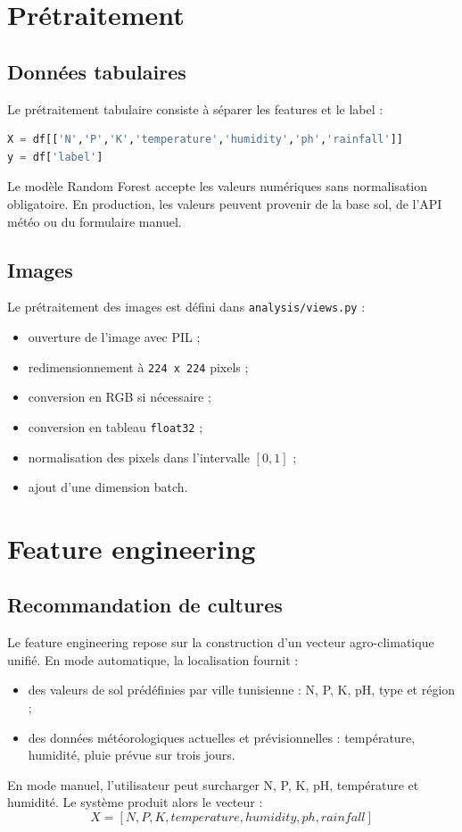 \documentclass[12pt,a4paper]{report}
\begin{document}
\section{Prétraitement}
\subsection{Données tabulaires}
Le prétraitement tabulaire consiste à séparer les features et le label :
\begin{lstlisting}[language=Python]
X = df[['N','P','K','temperature','humidity','ph','rainfall']]
y = df['label']
\end{lstlisting}
Le modèle Random Forest accepte les valeurs numériques sans normalisation obligatoire. En production, les valeurs peuvent provenir de la base sol, de l'API météo ou du formulaire manuel.

\subsection{Images}
Le prétraitement des images est défini dans \texttt{analysis/views.py} :
\begin{itemize}[noitemsep]
  \item ouverture de l'image avec PIL ;
  \item redimensionnement à \texttt{224 x 224} pixels ;
  \item conversion en RGB si nécessaire ;
  \item conversion en tableau \texttt{float32} ;
  \item normalisation des pixels dans l'intervalle \([0,1]\) ;
  \item ajout d'une dimension batch.
\end{itemize}

\section{Feature engineering}
\subsection{Recommandation de cultures}
Le feature engineering repose sur la construction d'un vecteur agro-climatique unifié. En mode automatique, la localisation fournit :
\begin{itemize}[noitemsep]
  \item des valeurs de sol prédéfinies par ville tunisienne : N, P, K, pH, type et région ;
  \item des données météorologiques actuelles et prévisionnelles : température, humidité, pluie prévue sur trois jours.
\end{itemize}
En mode manuel, l'utilisateur peut surcharger N, P, K, pH, température et humidité. Le système produit alors le vecteur :
\[
X = [N, P, K, temperature, humidity, ph, rainfall]
\]
\end{document}
